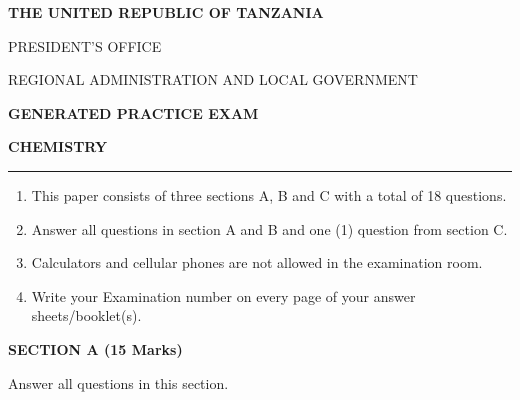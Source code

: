 \documentclass[12pt]{article}
\newcommand{\leftheading}[1]{
    \noindent{\fontsize{12}{14}\selectfont\bfseries #1}\par
}
\newcommand{\centerheading}[1]{
    \vspace{0.6em}
    \begin{center}
        {\fontsize{13}{15}\selectfont\bfseries #1}
    \end{center}
    \vspace{0.15em}
}
\begin{document}
\begin{center}
  {\fontsize{14}{16}\selectfont\bfseries THE UNITED REPUBLIC OF TANZANIA\par}
  \vspace{0.2em}
  {\fontsize{12}{14}\selectfont PRESIDENT’S OFFICE\par}
  {\fontsize{12}{14}\selectfont REGIONAL ADMINISTRATION AND LOCAL GOVERNMENT\par}
  \vspace{0.35em}
  {\fontsize{14}{16}\selectfont\bfseries GENERATED PRACTICE EXAM\par}
  {\fontsize{14}{16}\selectfont\bfseries CHEMISTRY\par}
\end{center}
\vspace{0.6em}
\vspace{0.8em}

\vspace{-1.0em}
\noindent\rule{\textwidth}{0.4pt}
\vspace{-1.0em}

\leftheading{INSTRUCTIONS}
\begin{enumerate}[itemsep=0pt, topsep=2pt, parsep=0pt, partopsep=0pt]
  \item This paper consists of three sections A, B and C with a total of 18 questions.
  \item Answer all questions in section A and B and one (1) question from section C.
  \item Calculators and cellular phones are not allowed in the examination room.
  \item Write your Examination number on every page of your answer sheets/booklet(s).
\end{enumerate}

\centerheading{SECTION A (15 Marks)}
\vspace{-2.0em}
\begin{center}
  Answer all questions in this section.
\end{center}
\end{document}
